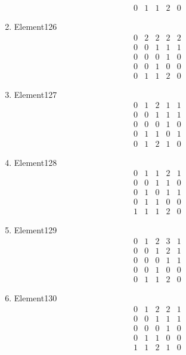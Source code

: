 \documentclass[12pt]{article}
\begin{document}
\begin{multicols}{3}
\begin{enumerate}
\begin{equation*}
\begin{array}{ccccc}
0&1&1&2&0
\end{array}
\end{equation*}
\item Element126
\begin{equation*}
\begin{array}{ccccc}
0&2&2&2&2\\
0&0&1&1&1\\
0&0&0&1&0\\
0&0&1&0&0\\
0&1&1&2&0
\end{array}
\end{equation*}
\item Element127
\begin{equation*}
\begin{array}{ccccc}
0&1&2&1&1\\
0&0&1&1&1\\
0&0&0&1&0\\
0&1&1&0&1\\
0&1&2&1&0
\end{array}
\end{equation*}
\item Element128
\begin{equation*}
\begin{array}{ccccc}
0&1&1&2&1\\
0&0&1&1&0\\
0&1&0&1&1\\
0&1&1&0&0\\
1&1&1&2&0
\end{array}
\end{equation*}
\item Element129
\begin{equation*}
\begin{array}{ccccc}
0&1&2&3&1\\
0&0&1&2&1\\
0&0&0&1&1\\
0&0&1&0&0\\
0&1&1&2&0
\end{array}
\end{equation*}
\item Element130
\begin{equation*}
\begin{array}{ccccc}
0&1&2&2&1\\
0&0&1&1&1\\
0&0&0&1&0\\
0&1&1&0&0\\
1&1&2&1&0
\end{array}
\end{equation*}

\end{enumerate}
\end{multicols}
\end{document}
